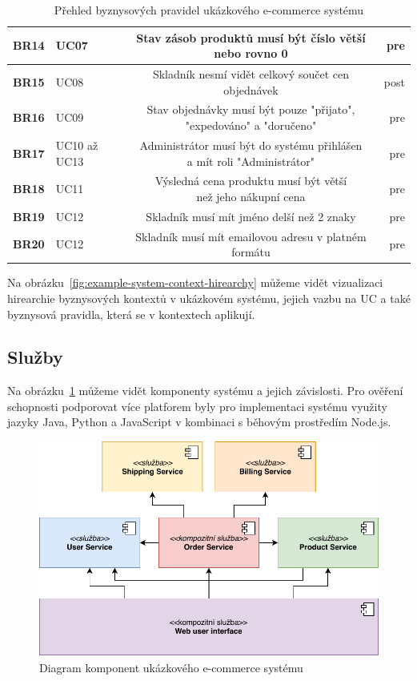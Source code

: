 \begin{table}
\begin{tabular}{ l l c r }
        \textbf{BR14} & UC07 & Stav zásob produktů musí být číslo větší nebo rovno 0 & pre \\ \hline
        \textbf{BR15} & UC08 & Skladník nesmí vidět celkový součet cen objednávek & post \\ \hline
        \textbf{BR16} & UC09 & \makecell[c]{Stav objednávky musí být pouze "přijato", \\ "expedováno" a "doručeno"} & pre \\ \hline
        \textbf{BR17} & UC10 až UC13 & \makecell[c]{Administrátor musí být do systému přihlášen \\ a mít roli "Administrátor"} & pre \\ \hline
        \textbf{BR18} & UC11 & \makecell[c]{Výsledná cena produktu musí být větší \\ než jeho nákupní cena} & pre \\ \hline
        \textbf{BR19} & UC12 & Skladník musí mít jméno delší než 2 znaky & pre \\ \hline
        \textbf{BR20} & UC12 & Skladník musí mít emailovou adresu v platném formátu & pre \\
        \hline
    \end{tabular}
    \caption{Přehled byznysových pravidel ukázkového e-commerce systému}
    \label{tbl:business-rules}
\end{table}


Na obrázku~\ref{fig:example-system-context-hirearchy} můžeme vidět vizualizaci
hirearchie byznysových kontextů v ukázkovém systému, jejich vazbu na UC a také byznysová
pravidla, která se v kontextech aplikují.

\subsection{Služby}

Na obrázku~\ref{fig:example-system} můžeme vidět komponenty systému a jejich závislosti.
Pro ověření schopnosti podporovat více platforem byly pro implementaci systému využity
jazyky Java, Python a JavaScript v kombinaci s běhovým prostředím Node.js.

\begin{figure}
    \centering
    \includegraphics[keepaspectratio=true, width=0.8\linewidth]{figures/example-system.pdf}
    \caption{Diagram komponent ukázkového e-commerce systému}
    \label{fig:example-system}
\end{figure}


